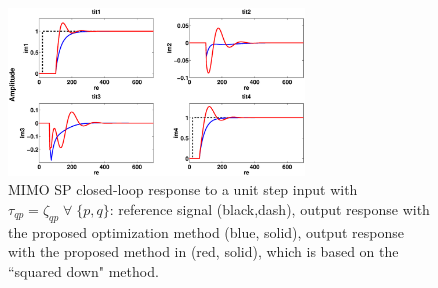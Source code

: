 \documentclass[A4, 10pt, conference]{ieeeconf}
\begin{document}
\begin{figure}[]
\centering
{}
\centerline{\includegraphics[width=0.7\textwidth]{pics/Rob_comp_LD35_1.eps}}
\caption{MIMO SP closed-loop response to a unit step input with $\tau_{qp}=\zeta_{qp} \; \forall \; \{p,q\}$: reference signal (black,dash), output response with the proposed optimization method (blue, solid), output response with the proposed method in \cite{RC06} (red, solid), which is based on the ``squared down" method.}
\label{fig:shell_no_del}
\end{figure}
\end{document}
